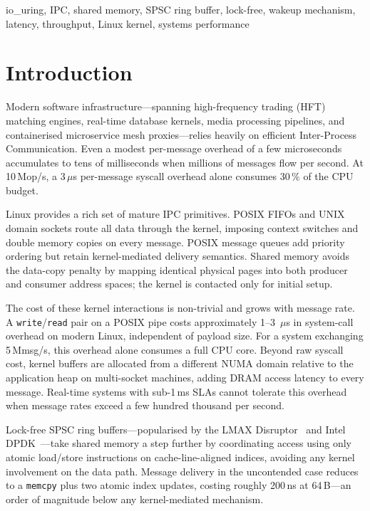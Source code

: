\documentclass[10pt,conference]{IEEEtran}
\begin{document}
\begin{IEEEkeywords}
io\_uring, IPC, shared memory, SPSC ring buffer, lock-free, wakeup mechanism,
latency, throughput, Linux kernel, systems performance
\end{IEEEkeywords}

\section{Introduction}

Modern software infrastructure---spanning high-frequency trading (HFT) matching
engines, real-time database kernels, media processing pipelines, and
containerised microservice mesh proxies---relies heavily on efficient
Inter-Process Communication.  Even a modest per-message overhead of a few
microseconds accumulates to tens of milliseconds when millions of messages flow
per second.  At 10\,Mop/s, a 3\,$\mu$s per-message syscall overhead alone
consumes 30\,\% of the CPU budget.

Linux provides a rich set of mature IPC primitives.  POSIX FIFOs and UNIX
domain sockets route all data through the kernel, imposing context switches and
double memory copies on every message.  POSIX message queues add priority
ordering but retain kernel-mediated delivery semantics.  Shared memory avoids
the data-copy penalty by mapping identical physical pages into both producer and
consumer address spaces; the kernel is contacted only for initial setup.

The cost of these kernel interactions is non-trivial and grows with message
rate.  A \texttt{write}/\texttt{read} pair on a POSIX pipe costs approximately
1--3\ $\mu$s in system-call overhead on modern Linux, independent of payload
size.  For a system exchanging 5\,Mmsg/s, this overhead alone consumes a full
CPU core.  Beyond raw syscall cost, kernel buffers are allocated from a
different NUMA domain relative to the application heap on multi-socket machines,
adding DRAM access latency to every message.  Real-time systems with sub-1\,ms
SLAs cannot tolerate this overhead when message rates exceed a few hundred
thousand per second.

Lock-free SPSC ring buffers---popularised by the LMAX
Disruptor~\cite{disruptor} and Intel DPDK~\cite{dpdk}---take shared memory a
step further by coordinating access using only atomic load/store instructions on
cache-line-aligned indices, avoiding any kernel involvement on the data path.
Message delivery in the uncontended case reduces to a \texttt{memcpy} plus two
atomic index updates, costing roughly 200\,ns at 64\,B---an order of magnitude
below any kernel-mediated mechanism.
\end{document}
